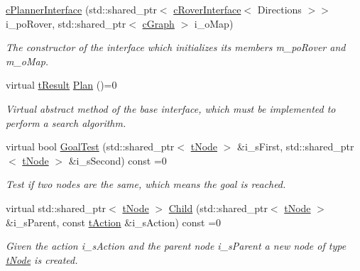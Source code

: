 \begin{DoxyCompactItemize}
\item 
\mbox{\label{classplanner_1_1c_planner_interface_a2d99a6f9fe144a0406c040d8da2a6dd4}} 
\mbox{\hyperlink{classplanner_1_1c_planner_interface_a2d99a6f9fe144a0406c040d8da2a6dd4}{c\+Planner\+Interface}} (std\+::shared\+\_\+ptr$<$ \mbox{\hyperlink{classplanner_1_1c_rover_interface}{c\+Rover\+Interface}}$<$ Directions $>$$>$ i\+\_\+po\+Rover, std\+::shared\+\_\+ptr$<$ \mbox{\hyperlink{classplanner_1_1c_graph}{c\+Graph}} $>$ i\+\_\+o\+Map)
\begin{DoxyCompactList}\small\item\em The constructor of the interface which initializes its members m\+\_\+po\+Rover and m\+\_\+o\+Map. \end{DoxyCompactList}\item 
virtual \mbox{\hyperlink{structt_result}{t\+Result}} \mbox{\hyperlink{classplanner_1_1c_planner_interface_a7a06632a8c53906daf39611d9692ffa5}{Plan}} ()=0
\begin{DoxyCompactList}\small\item\em Virtual abstract method of the base interface, which must be implemented to perform a search algorithm. \end{DoxyCompactList}\item 
virtual bool \mbox{\hyperlink{classplanner_1_1c_planner_interface_afec836d58ce54c49046bf30ecdebbfec}{Goal\+Test}} (std\+::shared\+\_\+ptr$<$ \mbox{\hyperlink{structplanner_1_1t_node}{t\+Node}} $>$ \&i\+\_\+s\+First, std\+::shared\+\_\+ptr$<$ \mbox{\hyperlink{structplanner_1_1t_node}{t\+Node}} $>$ \&i\+\_\+s\+Second) const =0
\begin{DoxyCompactList}\small\item\em Test if two nodes are the same, which means the goal is reached. \end{DoxyCompactList}\item 
virtual std\+::shared\+\_\+ptr$<$ \mbox{\hyperlink{structplanner_1_1t_node}{t\+Node}} $>$ \mbox{\hyperlink{classplanner_1_1c_planner_interface_a7e2048c2a4c699a76db90d1cbfecf156}{Child}} (std\+::shared\+\_\+ptr$<$ \mbox{\hyperlink{structplanner_1_1t_node}{t\+Node}} $>$ \&i\+\_\+s\+Parent, const \mbox{\hyperlink{structplanner_1_1t_action}{t\+Action}} \&i\+\_\+s\+Action) const =0
\begin{DoxyCompactList}\small\item\em Given the action i\+\_\+s\+Action and the parent node i\+\_\+s\+Parent a new node of type \mbox{\hyperlink{structplanner_1_1t_node}{t\+Node}} is created. \end{DoxyCompactList}\item 
$$
\end{DoxyCompactItemize}
